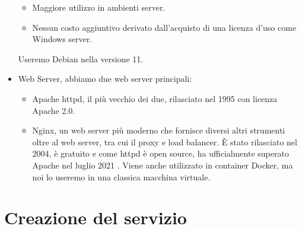 \begin{itemize}
\begin{itemize}
        \item Maggiore utilizzo in ambienti server.
        \item Nessun costo aggiuntivo derivato dall'acquisto di una licenza d'uso come Windows server.
    \end{itemize}
    Useremo Debian nella versione 11.
    \item Web Server, abbiamo due web server principali:
    \begin{itemize}
        \item Apache httpd, il più vecchio dei due, rilasciato nel 1995 con licenza Apache 2.0.
        \item Nginx, un web server più moderno che fornisce diversi altri strumenti oltre al web server, tra cui il proxy e load balancer. È stato rilasciato nel 2004, è gratuito e come httpd è open source, ha ufficialmente superato Apache nel luglio 2021 \cite{WebServerHistory}. Viene anche utilizzato in container Docker, ma noi lo useremo in una classica macchina virtuale.
    \end{itemize}
\end{itemize}

\newpage
\section{Creazione del servizio}

